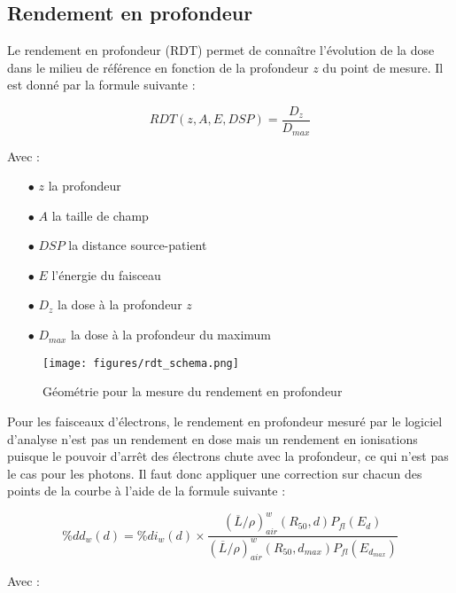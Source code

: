 \documentclass{article}
\begin{document}
\subsection{Rendement en profondeur}

Le rendement en profondeur (RDT) permet de connaître l'évolution de la dose dans le milieu de référence en fonction de la profondeur $z$ du point de mesure. Il est donné par la formule suivante :

\begin{equation}
  RDT(z, A, E, DSP) = \dfrac{D_z}{D_{max}}
  \label{eq_rdt}
\end{equation}

Avec :

\begin{itemize}
  \item[$\bullet$] $z$ la profondeur
  \item[$\bullet$] $A$ la taille de champ
  \item[$\bullet$] $DSP$ la distance source-patient
  \item[$\bullet$] $E$ l'énergie du faisceau
  \item[$\bullet$] $D_z$ la dose à la profondeur $z$
  \item[$\bullet$] $D_{max}$ la dose à la profondeur du maximum
\end{itemize}

\begin{figure}[h]
  \centering
  \texttt{[image: figures/rdt\_schema.png]}
  \caption{Géométrie pour la mesure du rendement en profondeur}
  \label{fig_rdt}
\end{figure}

Pour les faisceaux d'électrons, le rendement en profondeur mesuré par le logiciel d'analyse n'est pas un rendement en dose mais un rendement en ionisations puisque le pouvoir d'arrêt des électrons chute avec la profondeur, ce qui n'est pas le cas pour les photons. Il faut donc appliquer une correction sur chacun des points de la courbe à l'aide de la formule suivante \cite{fm1991clinical}\cite{gerbi2009recommendations} :

\begin{equation}
  \%dd_w(d) = \%di_w(d) \times \dfrac{(\overline{L}/\rho)^w_{air}(R_{50}, d) P_{fl}(E_d)}{(\overline{L}/\rho)^w_{air} (R_{50}, d_{max}) P_{fl}(E_{d_{max}})}
\end{equation}

Avec :
\end{document}

